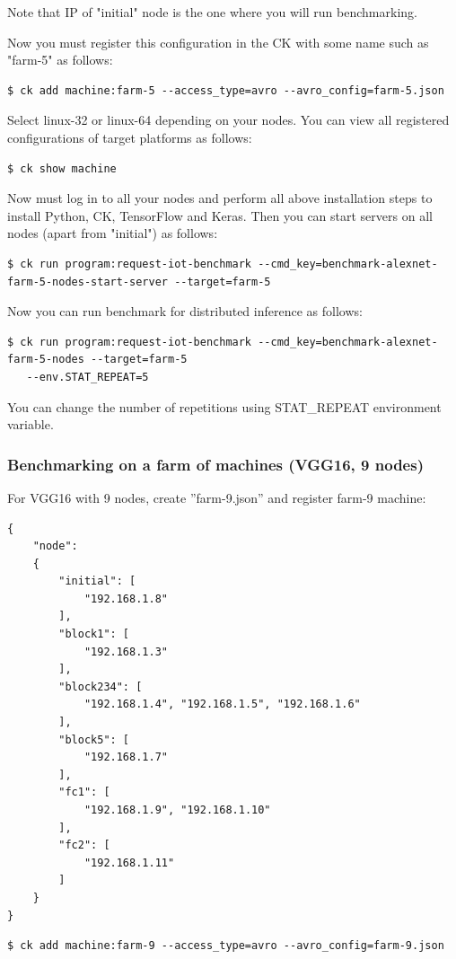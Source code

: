 \documentclass[sigplan]{acmart}
\begin{document}
Note that IP of "initial" node is the one where you will run benchmarking.

Now you must register this configuration in the CK with some name such as "farm-5" as follows:
\begin{verbatim}
$ ck add machine:farm-5 --access_type=avro --avro_config=farm-5.json
\end{verbatim}

Select linux-32 or linux-64 depending on your nodes. 
You can view all registered configurations of target platforms as follows:
\begin{verbatim}
$ ck show machine
\end{verbatim}

Now must log in to all your nodes and perform all above installation steps
to install Python, CK, TensorFlow and Keras. Then you can start servers
on all nodes (apart from "initial") as follows:

\begin{verbatim}
$ ck run program:request-iot-benchmark --cmd_key=benchmark-alexnet-farm-5-nodes-start-server --target=farm-5 
\end{verbatim}
Now you can run benchmark for distributed inference as follows:
\begin{verbatim}
$ ck run program:request-iot-benchmark --cmd_key=benchmark-alexnet-farm-5-nodes --target=farm-5
   --env.STAT_REPEAT=5
\end{verbatim}

You can change the number of repetitions using STAT\_REPEAT environment variable.

\subsubsection{Benchmarking on a farm of machines (VGG16, 9 nodes)}

For VGG16 with 9 nodes, create ''farm-9.json'' and register farm-9 machine:
\begin{verbatim}
{
    "node":
    {
        "initial": [
            "192.168.1.8"
        ],
        "block1": [
            "192.168.1.3"
        ],
        "block234": [
            "192.168.1.4", "192.168.1.5", "192.168.1.6"
        ],
        "block5": [
            "192.168.1.7"
        ],
        "fc1": [
            "192.168.1.9", "192.168.1.10"
        ],
        "fc2": [
            "192.168.1.11"
        ]
    }
}
\end{verbatim}

\begin{verbatim}
$ ck add machine:farm-9 --access_type=avro --avro_config=farm-9.json
\end{verbatim}
\end{document}
